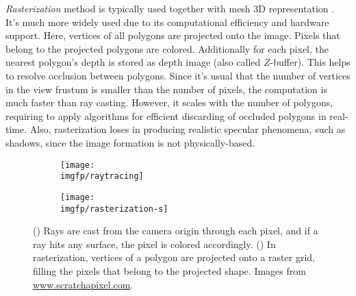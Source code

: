 \textit{Rasterization} method is typically used together with mesh 3D representation \cite{aux:raster94}. It's much more widely used due to its computational efficiency and hardware support. Here, vertices of all polygons are projected onto the image. Pixels that belong to the projected polygons are colored. Additionally for each pixel, the nearest polygon's depth is stored as depth image (also called $Z$-buffer). This helps to resolve occlusion between polygons. Since it's usual that the number of vertices in the view frustum is smaller than the number of pixels, the computation is much faster than ray casting. However, it scales with the number of polygons, requiring to apply algorithms for efficient discarding of occluded polygons in real-time. Also, rasterization loses in producing realistic specular phenomena, such as shadows, since the image formation is not physically-based.




\begin{figure}[h!]
	\centering
	\begin{subfigure}[b]{0.49\textwidth}
		\centering
		\texttt{[image: \\imgfp/raytracing]}
		\caption{}
		\label{lit:fig:raytracing}
	\end{subfigure}
	\hfill
	\begin{subfigure}[b]{0.49\textwidth}
		\centering
		\texttt{[image: \\imgfp/rasterization-s]}
		\caption{}
		\label{lit:fig:rasterization}
	\end{subfigure}
	
	\caption{(\protect{}) Rays are cast from the camera origin through each pixel, and if a ray hits any surface, the pixel is colored accordingly. (\protect{}) In rasterization, vertices of a polygon are projected onto a raster grid, filling the pixels that belong to the projected shape. Images from \href{https://www.scratchapixel.com/}{www.scratchapixel.com}.}
	\label{lit:fig:rendering-methods}
\end{figure}

